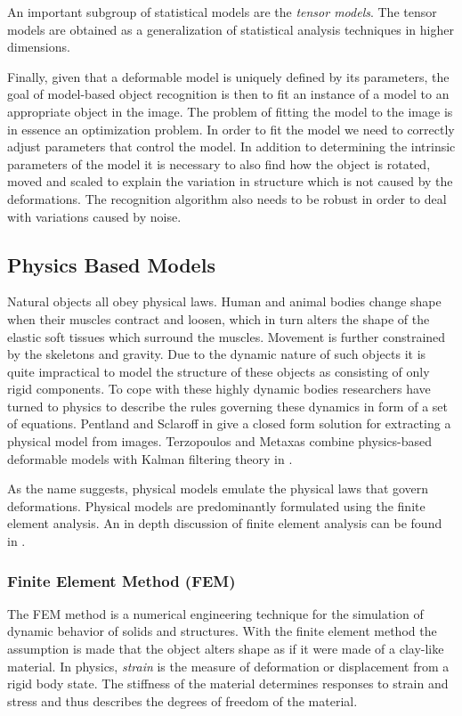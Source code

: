 \documentclass[11pt,a4paper]{report}
\begin{document}
An important subgroup of statistical models are the \textit{tensor models}. The
tensor models are obtained as a generalization of statistical analysis
techniques in higher dimensions.

Finally, given that a deformable model is uniquely defined by its parameters,
 the goal of model-based object recognition is then to fit an instance of a model to
an appropriate object in the image. The problem of fitting the model to the
image is in essence an optimization problem. In order to fit the model we need to
correctly adjust parameters that control the model. In addition to determining
the intrinsic parameters of the model it is necessary to also find how the
object is rotated, moved and scaled to explain the variation in structure which
is not caused by the deformations. The recognition algorithm also needs to be
robust in order to deal with variations caused by noise.

\subsection{Physics Based Models}
Natural objects all obey physical laws. Human and animal bodies change shape
when their muscles contract and loosen, which in turn alters the shape of the
elastic soft tissues which surround the muscles. Movement is further constrained
by the skeletons and gravity. Due to the dynamic nature of such objects it is quite impractical to
model the structure of these objects as consisting of only rigid components. To cope with
these highly dynamic bodies researchers have turned to physics to describe the
rules governing these dynamics in form of a set of equations. Pentland and
Sclaroff in  \cite{FEM1pen} give a closed form solution for extracting a
physical model from images. Terzopoulos and Metaxas combine physics-based
deformable models with Kalman filtering theory in \cite{FEM1ter}.  

As the name suggests, physical models emulate the physical laws that govern
deformations. Physical models are predominantly formulated using the finite
element analysis. An in depth discussion of finite element
analysis can be found in \cite{FEMbook}.

\subsubsection{Finite Element Method (FEM)}
The FEM method is a numerical engineering technique for the simulation of dynamic
behavior of solids and structures. With the finite element method the assumption is made that
the object alters shape as if it were made of a clay-like material. In physics,
\textit{strain} is the measure of deformation or displacement from a rigid body state. The stiffness
of the material determines responses to strain and stress and thus describes the
degrees of freedom of the material.
\end{document}
